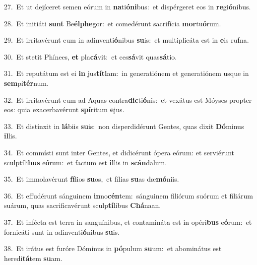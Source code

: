 {\numbfont\textcolor{\numbcolor}{27.}}~Et ut dejíceret semen eórum in \textbf{na}\-ti\-\textbf{ó}\-\textbf{ni}bus:~\star et dispérgeret eos in \textbf{re}\-gi\-\textbf{ó}\-nibus.\par
{\numbfont\textcolor{\numbcolor}{28.}}~Et initiáti \textbf{sunt} Be\-\textbf{él}\-\textbf{phe}gor:~\star et comedérunt sacrifícia \textbf{mor}\-tu\-\textbf{ó}\-rum.\par
{\numbfont\textcolor{\numbcolor}{29.}}~Et irritavérunt eum in adinventi\-\textbf{ó}\-nibus \textbf{su}\-is:~\star et multiplicáta est in \textbf{e}\-is ru\-\textbf{í}\-na.\par
{\numbfont\textcolor{\numbcolor}{30.}}~Et stetit Phínees, \textbf{et} pla\-\textbf{cá}\-vit:~\star et ces\-\textbf{sá}\-vit quas\-\textbf{sá}\-tio.\par
{\numbfont\textcolor{\numbcolor}{31.}}~Et reputátum est ei \textbf{in} jus\-\textbf{tí}\-\textbf{ti}am:~\star in generatiónem et generatiónem usque in \textbf{sem}\-pi\-\textbf{tér}\-num.\par
{\numbfont\textcolor{\numbcolor}{32.}}~Et irritavérunt eum ad Aquas contra\-\textbf{dic}\-ti\-\textbf{ó}\-nis:~\star et vexátus est Móyses propter eos: quia exacerbavérunt \textbf{spí}\-ritum \textbf{e}\-jus.\par
{\numbfont\textcolor{\numbcolor}{33.}}~Et distínxit in \textbf{lá}\-biis \textbf{su}\-is:~\star non disperdidérunt Gentes, quas dixit \textbf{Dó}\-minus \textbf{il}\-lis.\par
{\numbfont\textcolor{\numbcolor}{34.}}~Et commísti sunt inter Gentes, et didicérunt ópera eórum: et serviérunt sculptíli\textbf{bus} e\-\textbf{ó}\-rum:~\star et factum est \textbf{il}\-lis in \textbf{scán}\-dalum.\par
{\numbfont\textcolor{\numbcolor}{35.}}~Et immolavérunt \textbf{fí}\-lios \textbf{su}\-os,~\star et fílias \textbf{su}\-as dæ\-\textbf{mó}\-niis.\par
{\numbfont\textcolor{\numbcolor}{36.}}~Et effudérunt sánguinem \textbf{in}\-no\-\textbf{cén}\-tem:~\star sánguinem filiórum suórum et filiárum suárum, quas sacrificavérunt sculp\-\textbf{tí}\-libus \textbf{Chá}\-naan.\par
{\numbfont\textcolor{\numbcolor}{37.}}~Et infécta est terra in sanguínibus, et contamináta est in opéri\textbf{bus} e\-\textbf{ó}\-rum:~\star et fornicáti sunt in adinventi\-\textbf{ó}\-nibus \textbf{su}\-is.\par
{\numbfont\textcolor{\numbcolor}{38.}}~Et irátus est furóre Dóminus in \textbf{pó}\-pulum \textbf{su}\-um:~\star et abominátus est heredi\-\textbf{tá}\-tem \textbf{su}\-am.\par
